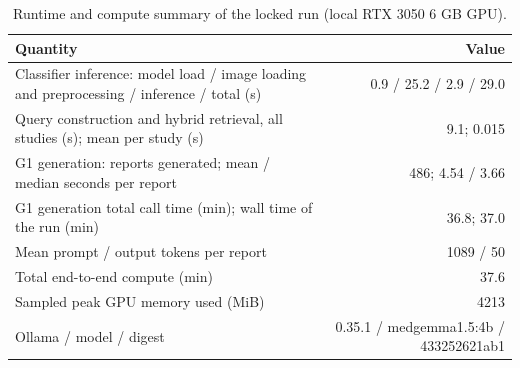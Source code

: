 \begin{table}[t]
\centering
\scriptsize
\begin{tabular}{lr}
\hline
Quantity & Value \\
\hline
Classifier inference: model load / image loading and preprocessing / inference / total (s) & 0.9 / 25.2 / 2.9 / 29.0 \\
Query construction and hybrid retrieval, all studies (s); mean per study (s) & 9.1; 0.015 \\
G1 generation: reports generated; mean / median seconds per report & 486; 4.54 / 3.66 \\
G1 generation total call time (min); wall time of the run (min) & 36.8; 37.0 \\
Mean prompt / output tokens per report & 1089 / 50 \\
Total end-to-end compute (min) & 37.6 \\
Sampled peak GPU memory used (MiB) & 4213 \\
Ollama / model / digest & 0.35.1 / medgemma1.5:4b / 433252621ab1 \\
\hline
\end{tabular}
\caption{Runtime and compute summary of the locked run (local RTX 3050 6 GB GPU).}
\label{tab:table10_runtime_compute}
\end{table}
